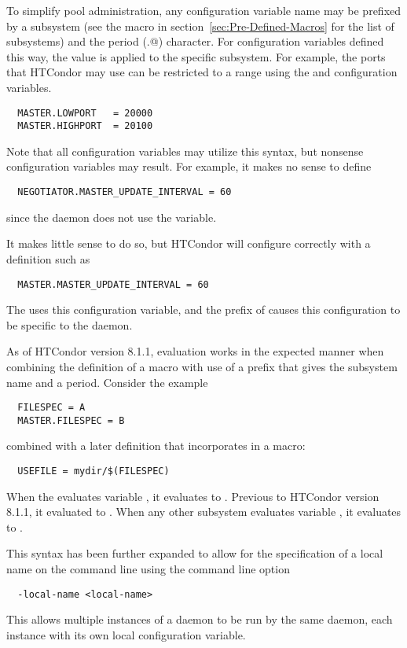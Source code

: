To simplify pool administration,
any configuration variable name may be prefixed by
a subsystem 
(see the  macro in 
section~\ref{sec:Pre-Defined-Macros}
for the list of subsystems)
and the period (\verb@.@) character.
For configuration variables defined this way,
the value is applied to the specific subsystem.
For example,
the ports that HTCondor may use can be restricted to a range 
using the  and  configuration
variables.

\begin{verbatim}
  MASTER.LOWPORT   = 20000
  MASTER.HIGHPORT  = 20100
\end{verbatim}

Note that all configuration variables may utilize this syntax,
but nonsense configuration variables may result.
For example, it makes no sense to define
\begin{verbatim}
  NEGOTIATOR.MASTER_UPDATE_INTERVAL = 60
\end{verbatim}
since the  daemon does not use the
 variable.

It makes little sense to do so, but HTCondor will configure
correctly with a definition such as
\begin{verbatim}
  MASTER.MASTER_UPDATE_INTERVAL = 60
\end{verbatim}
The  uses this configuration variable,
and the prefix of  causes this configuration
to be specific to the  daemon.

As of HTCondor version 8.1.1, evaluation works in the expected manner
when combining the definition of a macro with
use of a prefix that gives the subsystem name and a period. 
Consider the example
\begin{verbatim}
  FILESPEC = A
  MASTER.FILESPEC = B 
\end{verbatim}
combined with a later definition that incorporates 
in a macro:
\begin{verbatim}
  USEFILE = mydir/$(FILESPEC)
\end{verbatim}
When the  evaluates variable ,
it evaluates to . 
Previous to HTCondor version 8.1.1, it evaluated to .
When any other subsystem evaluates variable ,
it evaluates to .

This syntax has been further expanded to allow for the
specification of a local name on the command line 
using the command line option
\begin{verbatim}
  -local-name <local-name>
\end{verbatim}
This allows multiple instances of a daemon to be run 
by the same  daemon,
each instance with its own local configuration variable.

